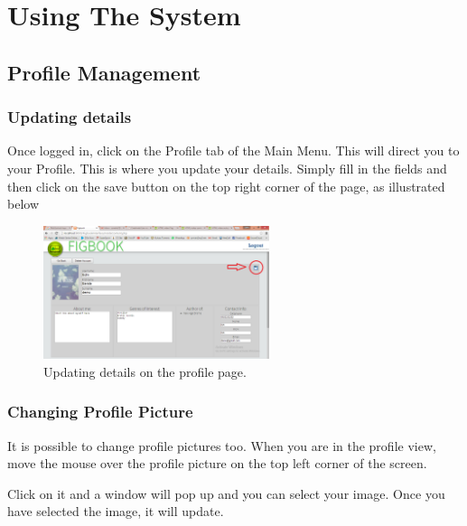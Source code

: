 \section{Using The System}



\newpage
\subsection{Profile Management}
\subsubsection{Updating details}
\par{Once logged in, click on the Profile tab of the Main Menu. This will direct you to your Profile. This is where you update your details. Simply fill in the fields and then click on the save button on the top right corner of the page, as illustrated below}

\begin{figure}[!h]
	\centering
	\includegraphics[width=250px]{images/profileSave.png}
	\caption{Updating details on the profile page.}
\end{figure}

\subsubsection{Changing Profile Picture}
\par{It is possible to change profile pictures too. When you are in the profile view, move the mouse over the profile picture on the top left corner of the screen.}

\par{Click on it and a window will pop up and you can select your image. Once you have selected the image, it will update.}

